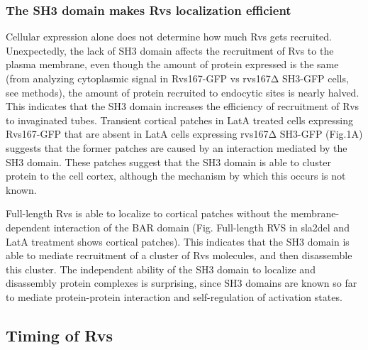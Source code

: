 \subsubsection{The SH3 domain makes Rvs localization efficient}
Cellular expression alone does not determine how much Rvs gets recruited. Unexpectedly, the lack of SH3 domain affects the recruitment of Rvs to the plasma membrane, even though the amount of protein expressed is the same (from analyzing cytoplasmic signal in Rvs167-GFP vs rvs167Δ SH3-GFP cells, see methods), the amount of protein recruited to endocytic sites is nearly halved. This indicates that the SH3 domain increases the efficiency of recruitment of Rvs to invaginated tubes. Transient cortical patches in LatA treated cells expressing Rvs167-GFP that are absent in LatA cells expressing rvs167Δ SH3-GFP (Fig.1A) suggests that the former patches are caused by an interaction mediated by the SH3 domain. These patches suggest that the SH3 domain is able to cluster protein to the cell cortex, although the mechanism by which this occurs is not known. 

Full-length Rvs is able to localize to cortical patches without the membrane-dependent interaction of the BAR domain (Fig. Full-length RVS in sla2del and LatA treatment shows cortical patches). This indicates that the SH3 domain is able to mediate recruitment of a cluster of Rvs molecules, and then disassemble this cluster.  The independent ability of the SH3 domain to localize and disassembly protein complexes is surprising, since SH3 domains are known so far to mediate protein-protein interaction and self-regulation of activation states. 

\subsection{Timing of Rvs}

